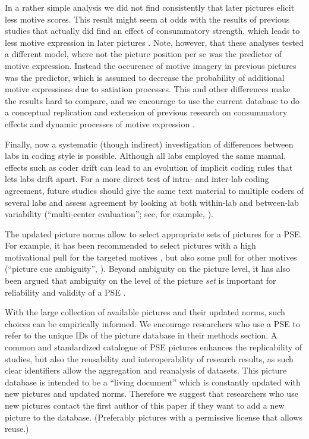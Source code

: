 \documentclass[man,a4paper,mask]{apa6}\usepackage[]{graphicx}\usepackage[]{color}
\begin{document}
In a rather simple analysis we did not find consistently that later pictures elicit less motive scores. This result might seem at odds with the results of previous studies that actually did find an effect of consummatory strength, which leads to less motive expression in later pictures \parencite{tuerlinckx_measuring_2002,lang_DynamicThurstonianItem_2014}. Note, however, that these analyses tested a different model, where not the picture position per se was the predictor of motive expression. Instead the occurence of motive imagery in previous pictures was the predictor, which is assumed to decrease the probability of additional motive expressions due to satiation processes. This and other differences make the results hard to compare, and we encourage to use the current database to do a conceptual replication and extension of previous research on consummatory effects and dynamic processes of motive expression \parencite{atkinson_dynamics_1970}.

Finally, now a systematic (though indirect) investigation of differences between labs in coding style is possible. Although all labs employed the same manual, effects such as coder drift \parencite{schultheiss_MeasuringImplicitMotives_2007} can lead to an evolution of implicit coding rules that lets labs drift apart. For a more direct test of intra- and inter-lab coding agreement, future studies should give the same text material to multiple coders of several labs and assess agreement by looking at both within-lab and between-lab variability (``multi-center evaluation''; see, for example, ).

The updated picture norms allow to select appropriate sets of pictures for a PSE. For example, it has been recommended to select pictures with a high motivational pull for the targeted motives \parencite{schultheiss_MeasuringImplicitMotives_2007,smith_MethodologicalConsiderationsSteps_1992}, but also some pull for other motives (``picture cue ambiguity'', ). Beyond ambiguity on the picture level, it has also been argued that ambiguity on the level of the picture \emph{set} is important for reliability and validity of a PSE \parencite{ramsay_SetAmbiguityKey_2013}. 

With the large collection of available pictures and their updated norms, such choices can be empirically informed. We encourage researchers who use a PSE to refer to the unique IDs of the picture database in their methods section. A common and standardized catalogue of PSE pictures enhances the replicability of studies, but also the reusability and interoperability of research results, as such clear identifiers allow the aggregation and reanalysis of datasets. 
This picture database is intended to be a ``living document'' which is constantly updated with new pictures and updated norms. Therefore we suggest that researchers who use new pictures contact the first author of this paper if they want to add a new picture to the database. (Preferably pictures with a permissive license that allows reuse.) 
\end{document}
